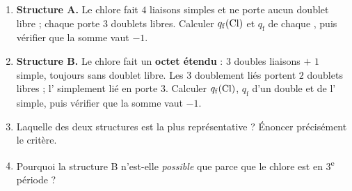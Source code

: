 \documentclass[11pt,a4paper]{article}
\begin{document}
\begin{exo}
\begin{enumerate}[label=\alph*),leftmargin=2em,itemsep=2pt]
  \item \textbf{Structure A.} Le chlore fait $4$ liaisons  simples et ne porte aucun
        doublet libre ; chaque  porte $3$ doublets libres. Calculer $q_{\mathrm{f}}(\ce{Cl})$
        et $q_{\mathrm{f}}$ de chaque , puis vérifier que la somme vaut $-1$.
  \item \textbf{Structure B.} Le chlore fait un \textbf{octet étendu} : $3$ doubles liaisons
        $+$ $1$ simple, toujours sans doublet libre. Les $3$  doublement liés portent $2$
        doublets libres ; l' simplement lié en porte $3$. Calculer $q_{\mathrm{f}}(\ce{Cl})$,
        $q_{\mathrm{f}}$ d'un  double et de l' simple, puis vérifier que la somme vaut $-1$.
  \item Laquelle des deux structures est la plus représentative ? Énoncer précisément le critère.
  \item Pourquoi la structure B n'est-elle \emph{possible} que parce que le chlore est en
        3\textsuperscript{e} période ?
\end{enumerate}
\end{exo}
\end{document}
